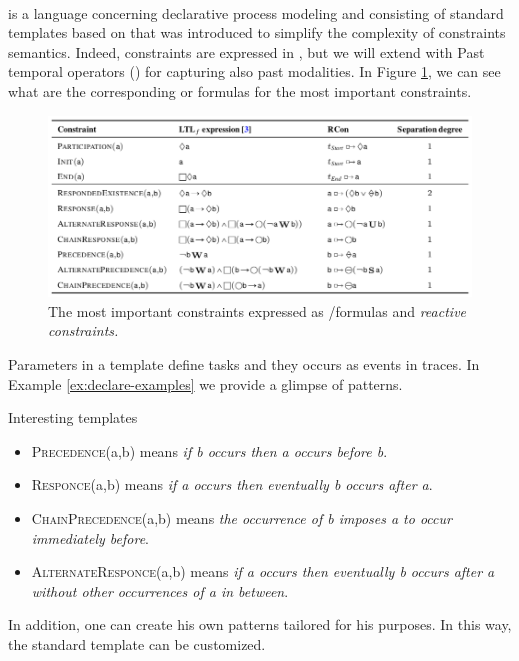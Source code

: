 \paragraph{\declare}
\declare is a language concerning declarative process modeling \citep{pesic2008constraint} and consisting of standard templates based on \citep{dwyer1999patterns} that was introduced to simplify the complexity of constraints semantics. Indeed, \declare constraints are expressed in \LTLf, but we will extend \LTLf with Past temporal operators (\LTLp) for capturing also past modalities. In Figure \ref{fig:declare-constraints}, we can see what are the corresponding \LTLf or \LTLp formulas for the most important \declare constraints. 
\begin{figure}[h]
\centering
\includegraphics[width=\textwidth]{images/declare-constraints}
\caption{The most important \declare constraints expressed as \LTLf/\PLTL formulas and \emph{reactive constraints.}}
\label{fig:declare-constraints}
\end{figure}
Parameters in a template define tasks and they occurs as events in traces. In Example \ref{ex:declare-examples} we provide a glimpse of \declare patterns.
\begin{example}\label{ex:declare-examples}
Interesting \declare templates \citep{maggi2013knowledge}
\begin{itemize}
\item \textsc{Precedence}(a,b) means \emph{if b occurs then a occurs before b}.
\item \textsc{Responce}(a,b) means \emph{if a occurs then eventually b occurs after a}.
\item \textsc{ChainPrecedence}(a,b) means \emph{the occurrence of b imposes a to occur immediately before}.
\item \textsc{AlternateResponce}(a,b) means \emph{if a occurs then eventually
b occurs after a without other occurrences of a in between}.
\end{itemize}
\end{example}
In addition, one can create his own 	\declare patterns tailored for his purposes. In this way, the \declare standard template can be customized.

